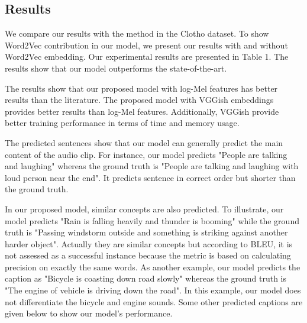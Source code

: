 \documentclass{article}
\begin{document}
\subsection{Results}

We compare our results with the method in the Clotho dataset. To show Word2Vec contribution in our model, we present our results with and without Word2Vec embedding. Our experimental results are presented in Table 1. The results show that our model outperforms the state-of-the-art. 

The results show that our proposed model with log-Mel features has better results than the literature. The proposed model with VGGish embeddings provides better results than log-Mel features. Additionally, VGGish provide better training performance in terms of time and memory usage.

The predicted sentences show that our model can generally predict the main content of the audio clip. For instance, our model predicts "People are talking and laughing" whereas the ground truth is "People are talking and laughing with loud person near the end". It predicts sentence in correct order but shorter than the ground truth. 

In our proposed model, similar concepts are also predicted. To illustrate, our model predicts "Rain is falling heavily and thunder is booming" while the ground truth is "Passing windstorm outside and something is striking against another harder object". Actually they are similar concepts but according to BLEU, it is not assessed as a successful instance because the metric is based on calculating precision on exactly the same words. As another example, our model predicts the caption as "Bicycle is coasting down road slowly" whereas the ground truth is "The engine of vehicle is driving down the road". In this example, our model does not differentiate the bicycle and engine sounds. Some other predicted captions are given below to show our model’s performance.
\end{document}
